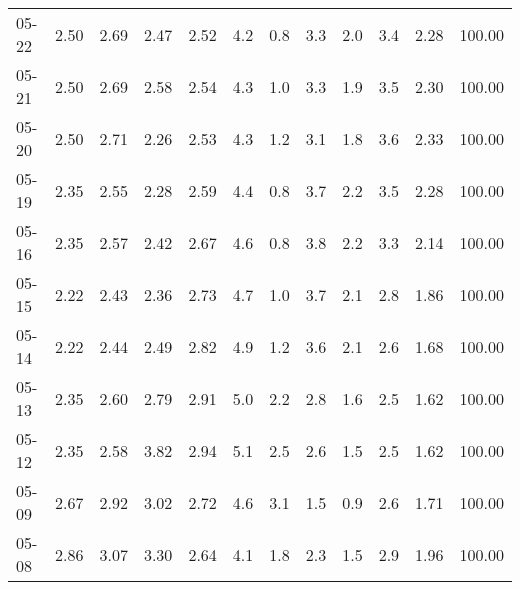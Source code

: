 \begin{threeparttable}
{\begin{tabular}{lrrrrrrrrrrr}
  05-22 &          2.50 &          2.69 &          2.47 &        2.52 &                 4.2 &                 0.8 &        3.3 &                 2.0 &              3.4 &            2.28 &                 100.00 \\
  05-21 &          2.50 &          2.69 &          2.58 &        2.54 &                 4.3 &                 1.0 &        3.3 &                 1.9 &              3.5 &            2.30 &                 100.00 \\
  05-20 &          2.50 &          2.71 &          2.26 &        2.53 &                 4.3 &                 1.2 &        3.1 &                 1.8 &              3.6 &            2.33 &                 100.00 \\
  05-19 &          2.35 &          2.55 &          2.28 &        2.59 &                 4.4 &                 0.8 &        3.7 &                 2.2 &              3.5 &            2.28 &                 100.00 \\
  05-16 &          2.35 &          2.57 &          2.42 &        2.67 &                 4.6 &                 0.8 &        3.8 &                 2.2 &              3.3 &            2.14 &                 100.00 \\
  05-15 &          2.22 &          2.43 &          2.36 &        2.73 &                 4.7 &                 1.0 &        3.7 &                 2.1 &              2.8 &            1.86 &                 100.00 \\
  05-14 &          2.22 &          2.44 &          2.49 &        2.82 &                 4.9 &                 1.2 &        3.6 &                 2.1 &              2.6 &            1.68 &                 100.00 \\
  05-13 &          2.35 &          2.60 &          2.79 &        2.91 &                 5.0 &                 2.2 &        2.8 &                 1.6 &              2.5 &            1.62 &                 100.00 \\
  05-12 &          2.35 &          2.58 &          3.82 &        2.94 &                 5.1 &                 2.5 &        2.6 &                 1.5 &              2.5 &            1.62 &                 100.00 \\
  05-09 &          2.67 &          2.92 &          3.02 &        2.72 &                 4.6 &                 3.1 &        1.5 &                 0.9 &              2.6 &            1.71 &                 100.00 \\
  05-08 &          2.86 &          3.07 &          3.30 &        2.64 &                 4.1 &                 1.8 &        2.3 &                 1.5 &              2.9 &            1.96 &                 100.00 \\

\end{tabular}}
\end{threeparttable}
